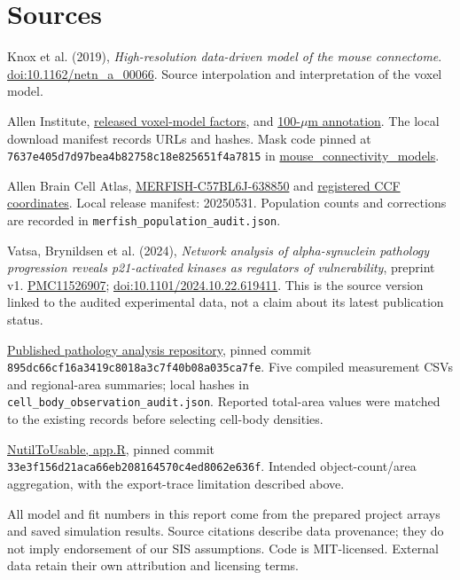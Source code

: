 \documentclass[10pt]{article}
\begin{document}
\section{Sources}
\small
\begin{enumerate}[label={[\arabic*]}]
\item Knox et al. (2019), \emph{High-resolution data-driven model of the mouse connectome}. \href{https://doi.org/10.1162/netn_a_00066}{doi:10.1162/netn\_a\_00066}. Source interpolation and interpretation of the voxel model.
\item Allen Institute, \href{https://download.alleninstitute.org/publications/A_high_resolution_data-driven_model_of_the_mouse_connectome/}{released voxel-model factors}, and \href{https://download.alleninstitute.org/informatics-archive/current-release/mouse_ccf/annotation/ccf_2017/annotation_100.nrrd}{100-\(\mu\)m annotation}. The local download manifest records URLs and hashes. Mask code pinned at \texttt{7637e405d7d97bea4b82758c18e825651f4a7815} in \href{https://github.com/AllenInstitute/mouse_connectivity_models}{mouse\_connectivity\_models}.
\item Allen Brain Cell Atlas, \href{https://alleninstitute.github.io/abc_atlas_access/descriptions/MERFISH-C57BL6J-638850.html}{MERFISH-C57BL6J-638850} and \href{https://alleninstitute.github.io/abc_atlas_access/notebooks/merfish_ccf_registration_tutorial.html}{registered CCF coordinates}. Local release manifest: 20250531. Population counts and corrections are recorded in \texttt{merfish\_population\_audit.json}.
\item Vatsa, Brynildsen et al. (2024), \emph{Network analysis of alpha-synuclein pathology progression reveals p21-activated kinases as regulators of vulnerability}, preprint v1. \href{https://pmc.ncbi.nlm.nih.gov/articles/PMC11526907/}{PMC11526907}; \href{https://doi.org/10.1101/2024.10.22.619411}{doi:10.1101/2024.10.22.619411}. This is the source version linked to the audited experimental data, not a claim about its latest publication status.
\item \href{https://github.com/jkbrynildsen/aSyn_spread/tree/895dc66cf16a3419c8018a3c7f40b08a035ca7fe}{Published pathology analysis repository}, pinned commit \texttt{895dc66cf16a3419c8018a3c7f40b08a035ca7fe}. Five compiled measurement CSVs and regional-area summaries; local hashes in \texttt{cell\_body\_observation\_audit.json}. Reported total-area values were matched to the existing records before selecting cell-body densities.
\item \href{https://github.com/DaniellaDeWeerd/NutilToUsable/blob/33e3f156d21aca66eb208164570c4ed8062e636f/app.R}{NutilToUsable, app.R}, pinned commit \texttt{33e3f156d21aca66eb208164570c4ed8062e636f}. Intended object-count/area aggregation, with the export-trace limitation described above.
\end{enumerate}
All model and fit numbers in this report come from the prepared project arrays and saved simulation results. Source citations describe data provenance; they do not imply endorsement of our SIS assumptions. Code is MIT-licensed. External data retain their own attribution and licensing terms.
\end{document}
